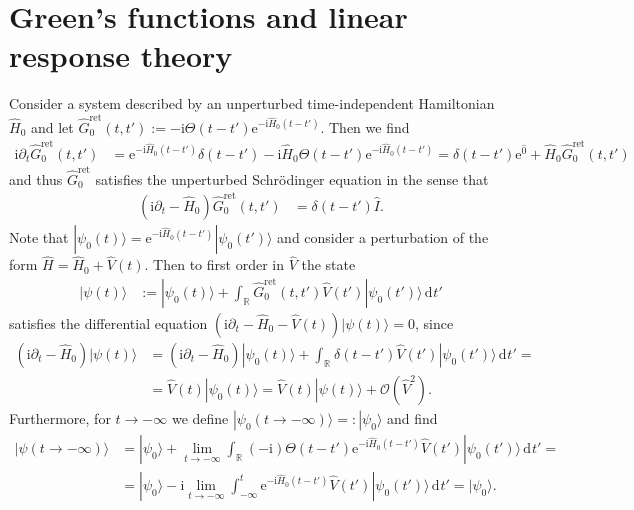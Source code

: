 \documentclass[english, parskip=full]{scrartcl}
\newcommand{\intr}{}
\newcommand{\kla}{}
\newcommand{\tecxt}{}
\newcommand{\Ket}{}
\renewcommand{\i}{\text{i}}
\newcommand{\e}{\text{e}}
\begin{document}
\section{Green's functions and linear response theory}
Consider a system described by an unperturbed time-independent Hamiltonian $\hat{H}_0$ and let $\hat{G}_0^\tecxt\text{ret}(t,t') := -\i \Theta (t - t') \e^{-\i \hat{H}_0 (t-t')}$.
Then we find
\begin{align}
\i\partial_t \hat{G}_0^\tecxt\text{ret} (t,t') &= \e^{-\i\hat{H}_0(t-t')} \delta(t-t')  - \i \hat{H}_0 \Theta(t-t') \e^{-\i\hat{H}_0(t-t')} = \delta(t-t') \e^{\hat{0}} + \hat{H}_0 \hat{G}_0^\tecxt\text{ret}(t,t')
\end{align}
and thus $\hat{G}_0^\tecxt\text{ret}$ satisfies the unperturbed Schrödinger equation in the sense that
\begin{align}
\kla\left( \i\partial_t - \hat{H}_0 \right) \hat{G}_0^\tecxt\text{ret}(t,t') &= \delta(t-t') \hat{I}.
\end{align}
Note that $\Ket | \psi_0(t) \rangle = \e^{-\i\hat{H}_0(t-t')} \Ket | \psi_0(t') \rangle$ and consider a perturbation of the form $\hat{H} = \hat{H}_0 + \hat{V}(t)$.
Then to first order in $\hat{V}$ the state
\begin{align}
\Ket | \psi(t) \rangle &:= \Ket | \psi_0(t) \rangle + \intr\int_{\mathbb{R}^{ }} \hat{G}_0^\tecxt\text{ret}(t,t') \hat{V}(t') \Ket | \psi_0(t') \rangle \, \mathrm{d}^{ }t'
\end{align}
satisfies the differential equation $\kla\left( \i\partial_t - \hat{H}_0 - \hat{V}(t) \right) \Ket | \psi(t) \rangle = 0$, since
\begin{align}
\kla\left( \i\partial_t - \hat{H}_0 \right) \Ket | \psi(t) \rangle &= \kla\left( \i\partial_t - \hat{H}_0 \right) \Ket | \psi_0(t) \rangle + \intr\int_{\mathbb{R}^{ }} \delta(t-t') \hat{V}(t') \Ket | \psi_0(t') \rangle \, \mathrm{d}^{ }t' = \\
&= \hat{V}(t) | \psi_0(t) \rangle = \hat{V}(t) \Ket | \psi(t) \rangle + \mathcal{O}\kla\left( \hat{V}^2 \right).
\end{align}
Furthermore, for $t\rightarrow -\infty$ we define $\Ket | \psi_0(t\rightarrow -\infty) \rangle =: \Ket | \psi_0 \rangle$ and find
\begin{align}
\Ket | \psi(t\rightarrow -\infty) \rangle &= \Ket | \psi_0 \rangle + \lim_{t\rightarrow -\infty} \int_{\mathbb{R}^{ }} (-\i)\Theta(t - t') \e^{-\i\hat{H}_0(t-t')} \hat{V}(t') \Ket | \psi_0(t') \rangle  \, \mathrm{d}^{ }t' = \\
&= \Ket | \psi_0 \rangle - \i \lim_{t\rightarrow -\infty} \int_{-\infty}^t \e^{-\i\hat{H}_0(t-t')} \hat{V}(t') \Ket | \psi_0(t') \rangle  \, \mathrm{d}^{ }t' = \Ket | \psi_0 \rangle.
\end{align}
\end{document}
